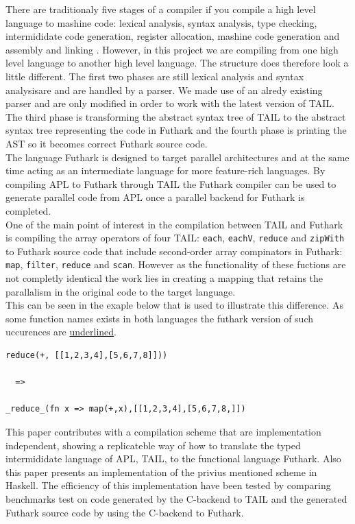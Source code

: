 \documentclass[11pt]{article}
\begin{document}
There are traditionaly five stages of a compiler if you compile a high level language to mashine code: 
lexical analysis, syntax analysis, type checking, intermididate code generation, register allocation, mashine 
code generation and assembly and linking \cite{TorbenMogensen}. However, in this project we are compiling from 
one high level language to another high level language. The structure does therefore look a little different. 
The first two phases are still lexical analysis and syntax analysisare and are handled by a parser. We made use of an alredy existing parser \cite{APLACC} and are only modified in order to work with the latest 
version of TAIL. The third phase is transforming the abstract syntax tree of TAIL to the abstract syntax tree 
representing the code in Futhark and the fourth phase is printing the AST so it becomes correct 
Futhark source code. \\

The language Futhark is designed to target parallel architectures and at the same time acting 
as an intermediate language for more feature-rich languages. By compiling APL to Futhark through TAIL the 
Futhark compiler can be used to generate parallel code from APL once a parallel backend for 
Futhark is completed.\\

One of the main point of interest in the compilation between TAIL and Futhark is compiling the array operators 
of four TAIL: {\tt each}, {\tt eachV}, 
 {\tt reduce} and {\tt zipWith} to Futhark source code that include second-order array compinators in Futhark:  
 {\tt map}, {\tt filter}, {\tt reduce} and {\tt scan}. However as the functionality of these fuctions are not completly 
 identical the work lies in creating a mapping that retains the parallalism in the original code to the target language.\\
 This can be seen in the exaple below that is used to illustrate this difference. 
 As some function names exists in both languages the futhark version of such uccurences are \underline{underlined}.

\begin{lstlisting}[numbers=none,frame=none]
reduce(+, [[1,2,3,4],[5,6,7,8]]))

  =>

_reduce_(fn x => map(+,x),[[1,2,3,4],[5,6,7,8,]])

\end{lstlisting}

This paper contributes with a compilation scheme that are implementation independent, showing a replicateble 
way of how to translate the typed intermididate language of APL, TAIL, to the functional language Futhark. Also 
this paper presents an implementation of the privius mentioned scheme in Haskell. The efficiency of this
 implementation have been tested by comparing benchmarks test on code generated by the C-backend to TAIL 
 and the generated Futhark source code by using the C-backend to Futhark. \\
\end{document}
